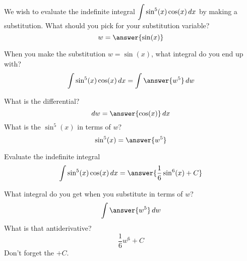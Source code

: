 \documentclass{ximera}
\author{Bobby Ramsey}
\begin{document}
\begin{exercise}

We wish to evaluate the indefinite integral $\displaystyle \int \sin^5(x) \cos(x) \mathop{}\!d x$ by making 
a substitution.  What should you pick for your substitution variable?
	\[ w = \answer{\sin(x)} \]
	\begin{exercise}
		When you make the substitution $w = \sin(x)$, what integral do you end up with?
		\[ \int \sin^5(x) \cos(x) \d x = \int \answer{w^5} \d w \]
		\begin{hint}
			What is the differential?  \[ \d w = \answer{\cos(x) } \d x\]
			What is the $\sin^5(x)$ in terms of $w$? \[\sin^5(x) = \answer{w^5}\]
		\end{hint}
		\begin{exercise}
			Evaluate the indefinite integral
			\[ \int \sin^5(x) \cos(x) \d x = \answer{\frac{1}{6} \sin^6(x) + C} \]
			\begin{hint}
				What integral do you get when you substitute in terms of $w$?
				\[ \int \answer{w^5} \d w \]
				What is that antiderivative?
				\[ \frac{1}{6} w^6 + C \]
				Don't forget the $+C$.
			\end{hint}
		\end{exercise}
	\end{exercise}
\end{exercise}
\end{document}
